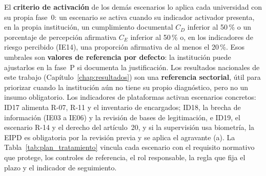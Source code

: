 El \textbf{criterio de activación} de los demás escenarios lo aplica cada universidad con su propia fase~0: un escenario se activa cuando su indicador activador presenta, en la propia institución, un cumplimiento documental $C_D$ inferior al 50\,\% o un porcentaje de percepción afirmativa $C_E$ inferior al 50\,\% o, en los indicadores de riesgo percibido (IE14), una proporción afirmativa de al menos el 20\,\%. Esos umbrales son \textbf{valores de referencia por defecto}: la institución puede ajustarlos en la fase~P si documenta la justificación. Los resultados nacionales de este trabajo (Capítulo~\ref{chap:resultados}) son una \textbf{referencia sectorial}, útil para priorizar cuando la institución aún no tiene su propio diagnóstico, pero no un insumo obligatorio. Los indicadores de plataformas activan escenarios concretos: ID17 alimenta R-07, R-11 y el inventario de encargados; ID18, la brecha de información (IE03 a IE06) y la revisión de bases de legitimación, e ID19, el escenario R-14 y el derecho del artículo~20, y si la supervisión usa biometría, la EIPD es obligatoria por la revisión previa y se aplica el agravante (a). La Tabla~\ref{tab:plan_tratamiento} vincula cada escenario con el requisito normativo que protege, los controles de referencia, el rol responsable, la regla que fija el plazo y el indicador de seguimiento.

